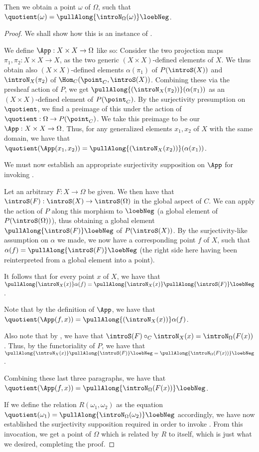 Then we obtain a point $\omega$ of $\Omega$, such that $\quotient(\omega) = \pullAlong{\introN_{\Omega}(\omega)} \loebNeg$.
\begin{proof}
We shall show how this is an instance of .

We define $\App : X \times X \to \Omega$ like so: Consider the two projection maps $\pi_1, \pi_2 : X \times X \to X$, as the two generic $(X \times X)$-defined elements of $X$. We thus obtain also $(X \times X)$-defined elements $\alpha(\pi_1)$ of $P(\introS(X))$ and $\introN_{X}(\pi_2)$ of $\Hom_C(\point_C, \introS(X))$. Combining these via the presheaf action of $P$, we get $\pullAlong{( \introN_{X}(\pi_2) )} ( \alpha(\pi_1) )$ as an $(X \times X)$-defined element of $P(\point_C)$. By the surjectivity presumption on $\quotient$, we find a preimage of this under the action of $\quotient : \Omega \to P(\point_C)$. We take this preimage to be our $\App : X \times X \to \Omega$. Thus, for any generalized elements $x_1, x_2$ of $X$ with the same domain, we have that $\quotient(\App(x_1, x_2)) = \pullAlong{( \introN_{X}(x_2) )} ( \alpha(x_1) )$.

We must now establish an appropriate surjectivity supposition on $\App$ for invoking . 

Let an arbitrary $F : X \to \Omega$ be given. We then have that $\introS(F) : \introS(X) \to \introS(\Omega)$ in the global aspect of $C$. We can apply the action of $P$ along this morphism to $\loebNeg$ (a global element of $P(\introS(\Omega))$), thus obtaining a global element $\pullAlong{\introS(F)} \loebNeg$ of $P(\introS(X))$. By the surjectivity-like assumption on $\alpha$ we made, we now have a corresponding point $f$ of $X$, such that $\alpha(f) = \pullAlong{\introS(F)} \loebNeg$ (the right side here having been reinterpreted from a global element into a point).

It follows that for every point $x$ of $X$, we have that $\pullAlong{\introN_{X}(x)} \alpha(f) = \pullAlong{\introN_{X}(x)} \pullAlong{\introS(F)} \loebNeg$.

Note that by the definition of $\App$, we have that $\quotient(\App(f, x)) = \pullAlong{( \introN_{X}(x) )} \alpha(f)$.

Also note that by , we have that $\introS(F) \circ_C \introN_{X}(x) = \introN_{\Omega}(F(x))$. Thus, by the functoriality of $P$, we have that $\pullAlong{\introN_{X}(x)} \pullAlong{\introS(F)} \loebNeg =  \pullAlong{\introN_{\Omega}(F(x))} \loebNeg$.

Combining these last three paragraphs, we have that $\quotient(\App(f, x)) =  \pullAlong{\introN_{\Omega}(F(x))} \loebNeg$.

If we define the relation $R(\omega_1, \omega_2)$ as the equation $\quotient(\omega_1) = \pullAlong{\introN_{\Omega}(\omega_2)} \loebNeg$ accordingly, we have now established the surjectivity supposition required in order to invoke . From this invocation, we get a point of $\Omega$ which is related by $R$ to itself, which is just what we desired, completing the proof.
\end{proof}
